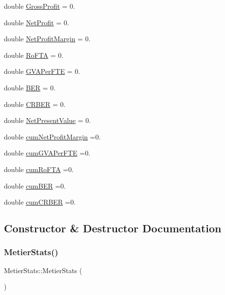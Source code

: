 \begin{DoxyCompactItemize}
\item 
double \mbox{\hyperlink{class_metier_stats_a90e39238a3b0ace8bca94da469cf48dd}{Gross\+Profit}} = 0.
\item 
double \mbox{\hyperlink{class_metier_stats_a22e928ace4f1f7cf90f58a199ea3d2b3}{Net\+Profit}} = 0.
\item 
double \mbox{\hyperlink{class_metier_stats_a97899249d922142d57bcc451e689e41b}{Net\+Profit\+Margin}} = 0.
\item 
double \mbox{\hyperlink{class_metier_stats_a0d37365e0099b8d80e800a826f024abd}{Ro\+F\+TA}} = 0.
\item 
double \mbox{\hyperlink{class_metier_stats_a0394fb4122cbe96031f8c43692aa1d9e}{G\+V\+A\+Per\+F\+TE}} = 0.
\item 
double \mbox{\hyperlink{class_metier_stats_a9fa9b41dd5e346e66a3ac4a04c374b60}{B\+ER}} = 0.
\item 
double \mbox{\hyperlink{class_metier_stats_aa1ced8e9bb2105d07c1c90b39a64d105}{C\+R\+B\+ER}} = 0.
\item 
double \mbox{\hyperlink{class_metier_stats_a9dfd38f1a6a7408cd7cd3aaf68f5b969}{Net\+Present\+Value}} = 0.
\item 
double \mbox{\hyperlink{class_metier_stats_a4c690902de417dcde6f3a6eb5c92dc2f}{cum\+Net\+Profit\+Margin}} =0.
\item 
double \mbox{\hyperlink{class_metier_stats_a0e1394b5bb2dee0faa539aca5aba1c92}{cum\+G\+V\+A\+Per\+F\+TE}} =0.
\item 
double \mbox{\hyperlink{class_metier_stats_a472594c40b72f250318f3d038d258b02}{cum\+Ro\+F\+TA}} =0.
\item 
double \mbox{\hyperlink{class_metier_stats_a15dd56c39902a1b7ba49cc298ff9bda3}{cum\+B\+ER}} =0.
\item 
double \mbox{\hyperlink{class_metier_stats_a07a1e23fec582bc3004fa344cbfab580}{cum\+C\+R\+B\+ER}} =0.
\end{DoxyCompactItemize}


\subsection{Constructor \& Destructor Documentation}
\mbox{\label{class_metier_stats_a31f0a96c6a8619d7cdd48a3bf0b5283d}} 
\subsubsection{\texorpdfstring{MetierStats()}{MetierStats()}}
{\footnotesize\ttfamily Metier\+Stats\+::\+Metier\+Stats (\begin{DoxyParamCaption}{ }\end{DoxyParamCaption})\hspace{0.3cm}{\ttfamily [inline]}}



